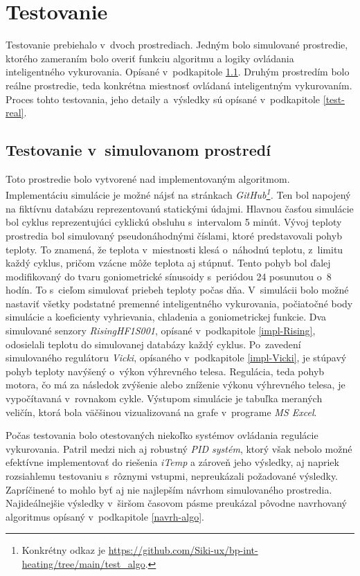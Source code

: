 \chapter{Testovanie}\label{test}
Testovanie prebiehalo v~dvoch prostrediach. 
Jedným bolo simulované prostredie, ktorého zameraním bolo overiť funkciu algoritmu a logiky ovládania inteligentného vykurovania. Opísané v~podkapitole \ref{test-sim}.
Druhým prostredím bolo reálne prostredie, teda konkrétna miestnosť ovládaná inteligentným vykurovaním. 
Proces tohto testovania, jeho detaily a~výsledky sú opísané v~podkapitole \ref{test-real}.

\section{Testovanie v~simulovanom prostredí}\label{test-sim}
Toto prostredie bolo vytvorené nad implementovaným algoritmom. 
Implementáciu simulácie je možné nájsť na stránkach \emph{GitHub\footnote{Konkrétny odkaz je \url{https://github.com/Siki-ux/bp-int-heating/tree/main/test_algo}.}.}
Ten bol napojený na fiktívnu databázu reprezentovanú statickými údajmi. 
Hlavnou časťou simulácie bol cyklus reprezentujúci cyklickú obsluhu s~intervalom 5 minút. 
Vývoj teploty prostredia bol simulovaný pseudonáhodnými číslami, ktoré predstavovali pohyb teploty.
To znamená, že teplota v~miestnosti klesá o~náhodnú teplotu, z~limitu každý cyklus, pričom vzácne môže teplota aj stúpnuť.
Tento pohyb bol ďalej modifikovaný do tvaru goniometrické sínusoidy s~periódou 24 posunutou o~8 hodín.
To s~cieľom simulovať priebeh teploty počas dňa.
V~simulácii bolo možné nastaviť všetky podstatné premenné inteligentného vykurovania, počiatočné body simulácie a koeficienty vyhrievania, chladenia a goniometrickej funkcie.
Dva simulované senzory \emph{RisingHF1S001}, opísané v~podkapitole \ref{impl-Rising}, odosielali teplotu do simulovanej databázy každý cyklus.
Po~zavedení simulovaného regulátoru \emph{Vicki}, opísaného v~podkapitole \ref{impl-Vicki}, je stúpavý pohyb teploty navýšený o~výkon výhrevného telesa.
Regulácia, teda pohyb motora, čo má za následok zvýšenie alebo zníženie výkonu výhrevného telesa, je vypočítavaná v~rovnakom cykle.
Výstupom simulácie je tabuľka meraných veličín, ktorá bola väčšinou vizualizovaná na grafe v~programe \emph{MS Excel}.

Počas testovania bolo otestovaných niekoľko systémov ovládania regulácie vykurovania. 
Patril medzi nich aj robustný \emph{PID systém}, ktorý však nebolo možné efektívne implementovať do riešenia \emph{iTemp} a zároveň jeho výsledky, aj napriek rozsiahlemu testovaniu s~rôznymi vstupmi, nepreukázali požadované výsledky.
Zapríčinené to mohlo byť aj nie najlepším návrhom simulovaného prostredia.
Najideálnejšie výsledky v~širšom časovom pásme preukázal pôvodne navrhovaný algoritmus opísaný v~podkapitole \ref{navrh-algo}.


